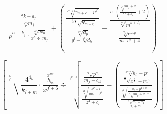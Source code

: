 \documentclass[aspectratio=169]{beamer}
\begin{document}

\begin{frame}
\fontsize{60pt}{60pt}

$$\frac{\frac{^ak+a_p}{\sqrt[v^w]{m_j}}}{p^{a+k_j}\cdot\frac{\sqrt[a^p]{m_n}}{x^p\div m_p}}+
\left(\frac{\frac{\sqrt[a^{m+j}]{r_{m+c}+p^{4^c}}}
{\sqrt[{\sqrt[k^l]{\frac{m}{c}}} \ \  \ \ \ ]{q_{m+c_l}}}}
{\frac{\sqrt[a^m]{d_p}}{g^l-\sqrt[q^p]{d_h}}}+
\frac{\frac{c\cdot\left(\frac{\sqrt[a^p]{m_j}+x}{c^2+d_l}+2\right)}{\sqrt[w^o]{m^{n+d_j}}}}{\frac{\sqrt[g_j]{er^{op}}}{m\cdot c^2+4}}\right) $$

\end{frame}


\begin{frame}
\fontsize{60pt}{60pt}

$$\left[ \sqrt[\frac{a_1}{b^4} \ \  \ \ \ \ \ ]{\frac{4^{4_k}}{k_{l+m}}\cdot \frac{\frac{x^{m^p}}{h_{l_m}}}{x^{f+6}}}\div \sqrt[q^{p+x}]{\frac{\frac{\sqrt[x_k \ \  \ \ \ ]{p^{d_k}}}{m_j-c_{lk}}}{\frac{\sqrt[2^l]{\frac{d^p+l}{m_{lp}-c^{p^k}}}}{z^4+c_l}}-\left( \frac{\frac{\sqrt[x^{p+x}]{h_l}+p^\circ}{\sqrt[\frac{a}{b} \ \  \ \ \ ]{x^{\frac{c}{d}}}+m^5}}{\frac{\sqrt[c^4]{\frac{a_l+p^{4+c}}{\sqrt[x_6 \ \  \ \ \ ]{m_p\div x^{c+1}}}}}{\frac{\sqrt[t^{a+c}]{m^c+x_k}}{x_l+m^c}}}  \right)} \right]$$

\end{frame}
\end{document}
